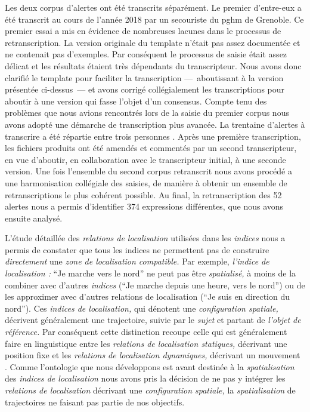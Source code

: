 Les deux corpus d'alertes ont été transcrits séparément. Le premier
d'entre-eux a été transcrit au cours de l'année 2018 par un secouriste
du \ac{pghm} de Grenoble. Ce premier essai a mis en évidence de
nombreuses lacunes dans le processus de retranscription. La version
originale du template n'était pas assez documentée et ne contenait pas
d'exemples. Par conséquent le processus de saisie était assez délicat
et les résultats étaient très dépendants du transcripteur. Nous avons
donc clarifié le template pour faciliter la transcription
---~aboutissant à la version présentée ci-dessus~--- et avons corrigé
collégialement les transcriptions pour aboutir à une version qui fasse
l'objet d'un consensus. Compte tenu des problèmes que nous avions
rencontrés lors de la saisie du premier corpus nous avons adopté une
démarche de transcription plus avancée. La trentaine d'alertes à
transcrire a été répartie entre trois personnes
\autocite{Bunel2019}. Après une première transcription, les fichiers
produits ont été amendés et commentés par un second transcripteur, en
vue d'aboutir, en collaboration avec le transcripteur initial, à une
seconde version. Une fois l'ensemble du second corpus retranscrit nous
avons procédé a une harmonisation collégiale des saisies, de manière à
obtenir un ensemble de retranscriptions le plus cohérent possible. Au
final, la retranscription des 52 alertes nous a permis d'identifier
374 expressions différentes, que nous avons ensuite analysé.

L'étude détaillée des \emph{relations de localisation} utilisées dans
les \emph{indices} nous a permis de constater que tous les indices ne
permettent pas de construire \emph{directement} une \emph{zone de
  localisation compatible.} Par exemple, \emph{l'indice de
  localisation :} \enquote{Je marche vers le nord} ne peut pas être
\emph{spatialisé,} à moins de la combiner avec d'autres \emph{indices}
(\eg \enquote{Je marche depuis une heure, vers le nord}) ou de les
approximer avec d'autres relations de localisation (\eg \enquote{Je
  suis en direction du nord}). Ces \emph{indices de localisation,} qui
dénotent une \emph{configuration spatiale,} décrivent généralement une
trajectoire, suivie par le \emph{sujet} et partant de \emph{l'objet de
  référence.} Par conséquent cette distinction recoupe celle qui est
généralement faire en linguistique entre les \emph{relations de
  localisation statiques,} décrivant une position fixe et les
\emph{relations de localisation dynamiques,} décrivant un mouvement
\autocite{Borillo1998}. Comme l'ontologie que nous développons est
avant destinée à la \emph{spatialisation} des \emph{indices de
  localisation} nous avons pris la décision de ne pas y intégrer les
\emph{relations de localisation} décrivant une \emph{configuration
  spatiale,} la \emph{spatialisation} de trajectoires ne faisant pas
partie de nos objectifs.

